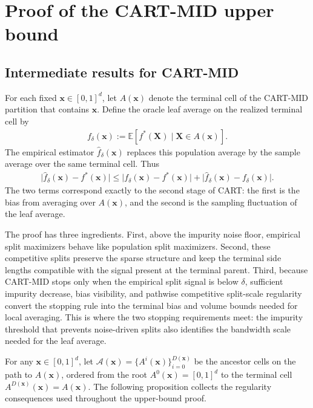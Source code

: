 \documentclass[11pt]{article}
\theoremstyle{plain}
\theoremstyle{definition}
\theoremstyle{remark}
\theoremstyle{plain}
\newcommand{\bx}{\mathbf{x}}
\newcommand{\bX}{\mathbf{X}}
\newcommand{\E}{\mathbb{E}}
\newcommand{\1}{\mathbbm{1}}
\begin{document}
\section{Proof of the CART-MID upper bound}
\label{app:cart-mid-upper-proof}

\subsection{Intermediate results for CART-MID}
\label{sec::erroranalysismid}

For each fixed $\bx\in[0,1]^d$, let $A(\bx)$ denote the terminal cell of the CART-MID partition that contains $\bx$. Define the oracle leaf average on the realized terminal cell by
\begin{align}\label{equ::fpdeltax}
f_{\delta}(\bx)
:=
\E[f^*(\bX)\mid \bX \in A(\bx)].
\end{align}
The empirical estimator $\hat f_\delta(\bx)$ replaces this population average by the sample average over the same terminal cell. Thus
\begin{align}\label{equ::errordecomposition}
\bigl|\hat{f}_{\delta}(\bx)-f^*(\bx)\bigr|
\le
\bigl|f_{\delta}(\bx)-f^*(\bx)\bigr|
+
\bigl|\hat{f}_{\delta}(\bx)-f_{\delta}(\bx)\bigr|.
\end{align}
The two terms correspond exactly to the second stage of CART: the first is the bias from averaging over $A(\bx)$, and the second is the sampling fluctuation of the leaf average.

The proof has three ingredients. First, above the impurity noise floor, empirical split maximizers behave like population split maximizers. Second, these competitive splits preserve the sparse structure and keep the terminal side lengths compatible with the signal present at the terminal parent. Third, because CART-MID stops only when the empirical split signal is below $\delta$, sufficient impurity decrease, bias visibility, and pathwise competitive split-scale regularity convert the stopping rule into the terminal bias and volume bounds needed for local averaging. This is where the two stopping requirements meet: the impurity threshold that prevents noise-driven splits also identifies the bandwidth scale needed for the leaf average.

For any $\bx \in [0,1]^d$, let
$\mathcal{A}(\bx)=\{A^i(\bx)\}_{i=0}^{D(\bx)}$
be the ancestor cells on the path to $A(\bx)$, ordered from the root
$A^0(\bx)=[0,1]^d$ to the terminal cell $A^{D(\bx)}(\bx)=A(\bx)$.
The following proposition collects the regularity consequences used throughout the upper-bound proof.
\end{document}

